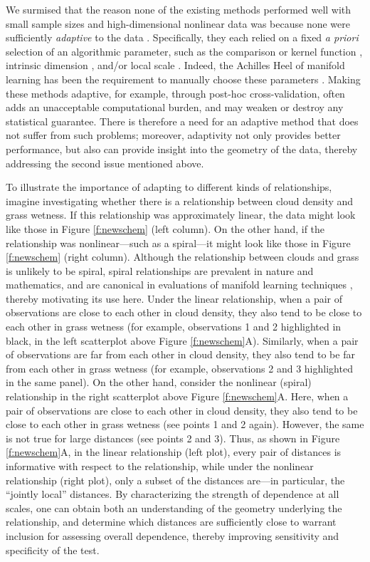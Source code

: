 \documentclass[11pt]{extarticle}
\begin{document}
We surmised that the reason none of the existing methods performed well with small sample sizes and high-dimensional nonlinear data was
because none were sufficiently \emph{adaptive} to the data \cite{zhang2012adaptive}.  Specifically, they each relied on a fixed \emph{a priori} selection of an algorithmic parameter, such as the comparison or kernel function \cite{gretton2006kernel}, intrinsic dimension \cite{Allard2012}, and/or local scale \cite{Friedman1983,Schilling1986}. Indeed, the Achilles Heel of manifold learning has been the requirement to manually choose these parameters \cite{levina2004maximum}. Making these methods adaptive, for example, through post-hoc cross-validation, often adds an unacceptable computational burden, and may weaken or destroy any statistical guarantee.
There is therefore a need for an adaptive method that does not suffer from such problems; moreover, adaptivity not only provides better performance, but also can provide insight into the geometry of the data, thereby addressing the second issue mentioned above.

To illustrate the importance of adapting to different kinds of relationships, imagine investigating whether there is a relationship between cloud density and grass wetness. If this relationship was approximately linear, the data might look like those in Figure \ref{f:newschem} (left column).
On the other hand, if the relationship was nonlinear---such as a  spiral---it might look like those in Figure \ref{f:newschem} (right column).
Although the relationship between clouds and grass is unlikely to be spiral, spiral relationships are prevalent in nature and mathematics, and are canonical in evaluations of manifold learning techniques \cite{Lee07a}, thereby motivating its use here.
%
Under the linear relationship, when a pair of observations are close to each other in cloud density, they  also tend to be close to each other in grass wetness (for example, observations 1 and 2 highlighted in black, in the left scatterplot above Figure \ref{f:newschem}{\color{magenta}A}).
Similarly,
when a pair of observations are far from each other in cloud density, they also tend to be far from each other in grass wetness (for example, observations 2 and 3 highlighted in the same panel).
On the other hand, consider the nonlinear (spiral) relationship in the right scatterplot above Figure \ref{f:newschem}{\color{magenta}A}.  Here, when a pair of observations are close to each other in cloud density, they also tend to be close to each other in grass wetness (see points 1 and 2 again).
However,  the same is not true for large distances  (see points 2 and 3).
%
Thus, as shown in Figure \ref{f:newschem}{\color{magenta}A}, in the linear relationship (left plot), every pair of distances is informative with respect to the relationship, while under the nonlinear relationship (right plot), only a subset of the distances are---in particular,  the ``jointly local'' distances. By characterizing the strength of dependence at all scales, one can obtain both an understanding of the geometry underlying the relationship, and determine which distances are sufficiently close to warrant inclusion for assessing overall dependence, thereby improving sensitivity and specificity of the test.
\end{document}
